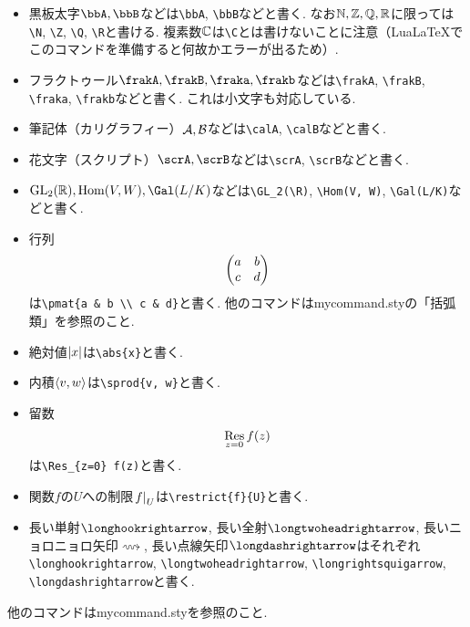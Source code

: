\documentclass[11pt,a4paper,oneside,lualatex]{ltjsarticle} %
\numberwithin{equation}{section} %
\begin{document}
\begin{itemize}
	\item 黒板太字$ \bbA, \bbB $などは\verb|\bbA|, \verb|\bbB|などと書く. 
	なお$ \mathbb{N}, \mathbb{Z}, \mathbb{Q}, \mathbb{R} $に限っては\verb|\N|, \verb|\Z|, \verb|\Q|, \verb|\R|と書ける. 
	複素数$ \mathbb{C} $は\verb|\C|とは書けないことに注意（LuaLaTeXでこのコマンドを準備すると何故かエラーが出るため）. 
	
	\item フラクトゥール$ \frakA, \frakB, \fraka, \frakb $などは\verb|\frakA|, \verb|\frakB|, \verb|\fraka|, \verb|\frakb|などと書く. これは小文字も対応している. 
	
	\item 筆記体（カリグラフィー）$ \mathcal{A}, \mathcal{B} $などは\verb|\calA|, \verb|\calB|などと書く. 
	
	\item 花文字（スクリプト）$ \scrA, \scrB $などは\verb|\scrA|, \verb|\scrB|などと書く. 
	
	\item $ \GL_2(\R), \Hom(V, W), \Gal(L/K) $などは\verb|\GL_2(\R)|, \verb|\Hom(V, W)|, \verb|\Gal(L/K)|などと書く. 
	
	\item 行列
	\[
	\begin{pmatrix}a & b \\ c & d\end{pmatrix}
	\]
	は\verb|\pmat{a & b \\ c & d}|と書く. 
	他のコマンドはmycommand.styの「括弧類」を参照のこと. 
	
	\item 絶対値$ \left\lvert x\right\rvert $は\verb|\abs{x}|と書く. 
	
	\item 内積$ \left\langle v, w\right\rangle $は\verb|\sprod{v, w}|と書く. 
	
	\item 留数
	\[
	\operatorname*{Res}_{z=0} f(z)
	\]
	は\verb|\Res_{z=0} f(z)|と書く. 
	
	\item 関数$ f $の$ U $への制限$ \left. f \right|_{U} $は\verb|\restrict{f}{U}|と書く. 
	
	\item 長い単射$ \longhookrightarrow $, 長い全射$ \longtwoheadrightarrow $, 長いニョロニョロ矢印$ \longrightsquigarrow $, 長い点線矢印$ \longdashrightarrow $はそれぞれ\verb|\longhookrightarrow|, \verb|\longtwoheadrightarrow|, \verb|\longrightsquigarrow|, \verb|\longdashrightarrow|と書く.
\end{itemize}


他のコマンドはmycommand.styを参照のこと. 


\end{document}
